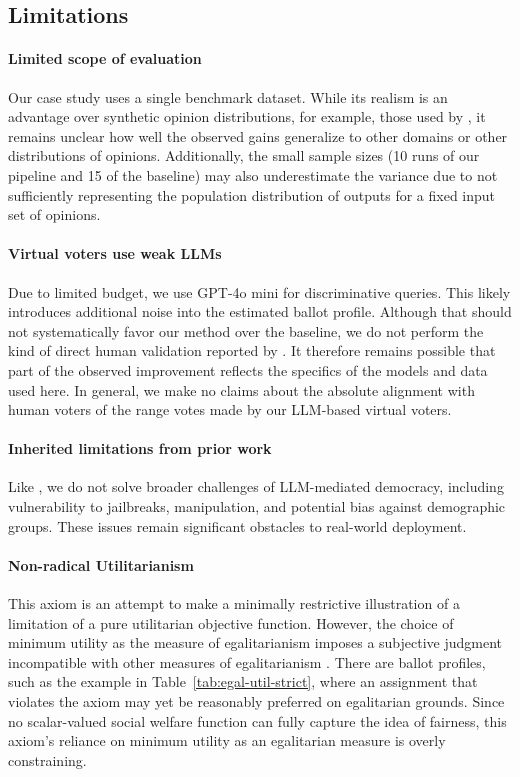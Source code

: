 \documentclass[11pt]{article}
\begin{document}
\subsection{Limitations} \label{sec:limitations}

\paragraph{Limited scope of evaluation}
Our case study uses a single benchmark dataset. While its realism is an advantage over synthetic opinion distributions, for example, those used by \citet{chandak-2023}, it remains unclear how well the observed gains generalize to other domains or other distributions of opinions. Additionally, the small sample sizes (10 runs of our pipeline and 15 of the baseline) may also underestimate the variance due to not sufficiently representing the population distribution of outputs for a fixed input set of opinions.

\paragraph{Virtual voters use weak LLMs}
Due to limited budget, we use GPT-4o mini for discriminative queries. This likely introduces additional noise into the estimated ballot profile. Although that should not systematically favor our method over the baseline, we do not perform the kind of direct human validation reported by \citet{fish-v2}. It therefore remains possible that part of the observed improvement reflects the specifics of the models and data used here. In general, we make no claims about the absolute alignment with human voters of the range votes made by our LLM-based virtual voters. 

\paragraph{Inherited limitations from prior work}
Like \citet{fish-v2}, we do not solve broader challenges of LLM-mediated democracy, including vulnerability to jailbreaks, manipulation, and potential bias against demographic groups. These issues remain significant obstacles to real-world deployment.

\paragraph{Non-radical Utilitarianism}
This axiom is an attempt to make a minimally restrictive illustration of a limitation of a pure utilitarian objective function. However, the choice of minimum utility as the measure of egalitarianism imposes a subjective judgment incompatible with other measures of egalitarianism \citep{atkinson-1970}. There are ballot profiles, such as the example in Table~\ref{tab:egal-util-strict}, where an assignment that violates the axiom may yet be reasonably preferred on egalitarian grounds. Since no scalar-valued social welfare function can fully capture the idea of fairness, this axiom's reliance on minimum utility as an egalitarian measure is overly constraining.
\end{document}
